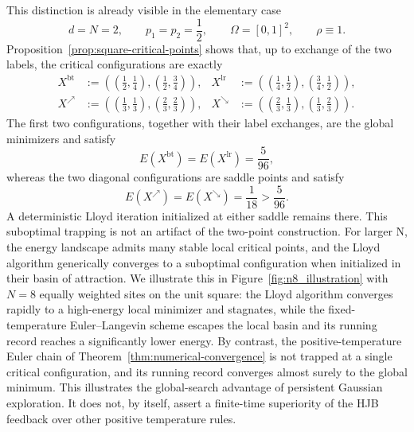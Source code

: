 \documentclass[11pt]{article}
\theoremstyle{definition}
\theoremstyle{remark}
\numberwithin{equation}{section}
\begin{document}
This distinction is already visible in the elementary case
\[
 d=N=2,
 \qquad
 p_1=p_2=\frac12,
 \qquad
 \Omega=[0,1]^2,
 \qquad
 \rho\equiv1.
\]
Proposition~\ref{prop:square-critical-points} shows that, up to exchange of the two labels, the
critical configurations are exactly
\begin{align*}
 X^{\mathrm{bt}}
 &:=\left(\left(\frac12,\frac14\right),
          \left(\frac12,\frac34\right)\right),
 &
 X^{\mathrm{lr}}
 &:=\left(\left(\frac14,\frac12\right),
          \left(\frac34,\frac12\right)\right),\\
 X^{\nearrow}
 &:=\left(\left(\frac13,\frac13\right),
          \left(\frac23,\frac23\right)\right),
 &
 X^{\searrow}
 &:=\left(\left(\frac23,\frac13\right),
          \left(\frac13,\frac23\right)\right).
\end{align*}
The first two configurations, together with their label exchanges, are the global minimizers and satisfy
\[
 E(X^{\mathrm{bt}})=E(X^{\mathrm{lr}})=\frac{5}{96},
\]
whereas the two diagonal configurations are saddle points and satisfy
\[
 E(X^{\nearrow})=E(X^{\searrow})=\frac1{18}>\frac{5}{96}.
\]
A deterministic Lloyd iteration initialized at either saddle remains there.
This suboptimal trapping is not an artifact of the two-point construction. For larger N, the energy landscape admits many stable local critical points, and the Lloyd algorithm generically converges to a suboptimal configuration when initialized in their basin of attraction. We illustrate this in Figure~\ref{fig:n8_illustration} with \(N=8\) equally weighted sites on the unit square: the Lloyd algorithm converges rapidly to a high-energy local minimizer and stagnates, while the fixed-temperature Euler–Langevin scheme escapes the local basin and its running record reaches a significantly lower energy.
By contrast, the positive-temperature Euler chain of Theorem~\ref{thm:numerical-convergence} is not trapped at a single critical configuration, and its running record converges almost surely to the global minimum. This illustrates the global-search advantage of persistent Gaussian exploration. It does not, by itself, assert a finite-time superiority of the HJB feedback over other positive temperature rules.
\end{document}
